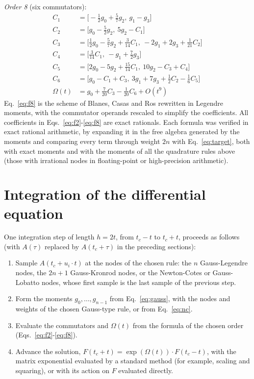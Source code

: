\documentclass[12pt]{article}
\begin{document}
\emph{Order 8} (six commutators):
\begin{equation}
\begin{aligned}
C_{1}&=\big[-\tfrac{1}{2}g_{0}+\tfrac{5}{7}g_{2},\ g_{1}-g_{3}\big]\\
C_{2}&=\big[g_{0}-\tfrac{5}{2}g_{2},\ 5g_{2}-C_{1}\big]\\
C_{3}&=\big[\tfrac{1}{2}g_{0}-\tfrac{5}{7}g_{2}+\tfrac{3}{14}C_{1},\ -2g_{1}+2g_{3}+\tfrac{1}{21}C_{2}\big]\\
C_{4}&=\big[\tfrac{3}{14}C_{1},\ -g_{1}+\tfrac{7}{2}g_{3}\big]\\
C_{5}&=\big[2g_{0}-5g_{2}+\tfrac{15}{14}C_{1},\ 10g_{2}-C_{3}+C_{4}\big]\\
C_{6}&=\big[g_{0}-C_{1}+C_{3},\ 3g_{1}+7g_{3}+\tfrac{1}{2}C_{2}-\tfrac{1}{6}C_{5}\big]\\
\Omega(t)&=g_{0}+\tfrac{7}{20}C_{3}-\tfrac{1}{20}C_{6}+O(t^{9})
\end{aligned}\label{eq:f8}
\end{equation}
Eq.~\ref{eq:f8} is the scheme of Blanes, Casas and Ros \cite{bcr2002} rewritten in Legendre moments, with the commutator operands rescaled to simplify the coefficients. All coefficients in Eqs.~\ref{eq:f2}-\ref{eq:f8} are exact rationals. Each formula was verified in exact rational arithmetic, by expanding it in the free algebra generated by the moments and comparing every term through weight $2n$ with Eq.~\ref{eq:target}, both with exact moments and with the moments of all the quadrature rules above (those with irrational nodes in floating-point or high-precision arithmetic).

\section*{Integration of the differential equation}

One integration step of length $h=2t$, from $t_c-t$ to $t_c+t$, proceeds as follows (with $A(\tau)$ replaced by $A(t_c+\tau)$ in the preceding sections):

\begin{enumerate}
\item Sample $A(t_c+u_i\cdot t)$ at the nodes of the chosen rule: the $n$ Gauss-Legendre nodes, the $2n+1$ Gauss-Kronrod nodes, or the Newton-Cotes or Gauss-Lobatto nodes, whose first sample is the last sample of the previous step.
\item Form the moments $g_0,\ldots,g_{n-1}$ from Eq.~\ref{eq:gauss}, with the nodes and weights of the chosen Gauss-type rule, or from Eq.~\ref{eq:nc}.
\item Evaluate the commutators and $\Omega(t)$ from the formula of the chosen order (Eqs.~\ref{eq:f2}-\ref{eq:f8}).
\item Advance the solution, $F(t_c+t)=\exp(\Omega(t))\cdot F(t_c-t)$, with the matrix exponential evaluated by a standard method (for example, scaling and squaring), or with its action on $F$ evaluated directly.
\end{enumerate}
\end{document}
